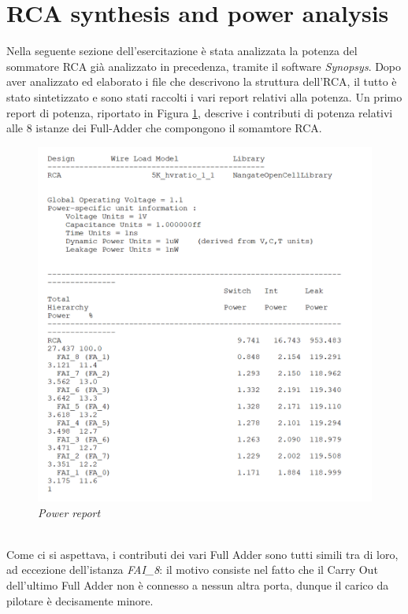 \section{RCA synthesis and power analysis}
Nella seguente sezione dell'esercitazione è stata analizzata la potenza del sommatore RCA già analizzato in precedenza, tramite il software \textit{Synopsys}. Dopo aver analizzato ed elaborato i file che descrivono la struttura dell'RCA, il tutto è stato sintetizzato e sono stati raccolti i vari report relativi alla potenza.
Un primo report di potenza, riportato in Figura \ref{report_power1}, descrive i contributi di potenza relativi alle 8 istanze dei Full-Adder che compongono il somamtore RCA. \\
\begin{figure}[!htb]
	\centering
	\includegraphics[scale=0.7]{immagini/report_power1}
	\caption{\textit{Power report}}
	\label{report_power1}
\end{figure}
\\
Come ci si aspettava, i contributi dei vari Full Adder sono tutti simili tra di loro, ad eccezione dell'istanza \textit{FAI\_8}: il motivo consiste nel fatto che il Carry Out dell'ultimo Full Adder non è connesso a nessun altra porta, dunque il carico da pilotare è decisamente minore.\\
